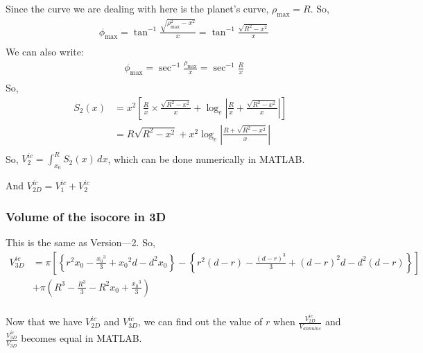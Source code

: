 \documentclass[12pt]{extarticle}
\begin{document}
Since the curve we are dealing with here is the planet's curve, $\rho_{\max} = R$. So,
\begin{align*} 
        &\phi_{\max} = \tan^{-1} \frac{\sqrt{\rho_{\max}^2 - x^2}}{x} = \tan^{-1} \frac{\sqrt{R^2 - x^2}}{x} \\
    \end{align*}
We can also write:
    \begin{align*} 
        &\phi_{\max} =  \sec^{-1} \frac{\rho_{\max}}{x} =  \sec^{-1} \frac{R}{x} \\
    \end{align*}
So,
    \begin{align*} 
        S_2 (x) &= x^2 \left[  \frac{R}{x} \times \frac{\sqrt{R^2 -x^2}}{x} + \log_e \left| \frac{R}{x} + \frac{\sqrt{R^2 -x^2}}{x}  \right|  \right] \\
        &= R \sqrt{R^2 -x^2} + x^2 \log_e \left| \frac{R+\sqrt{R^2 -x^2}}{x}  \right|   \\
    \end{align*}
So, $V^{ic}_2 = \int_{x_0}^{R} S_2(x) \,dx$, which can be done numerically in MATLAB.

And $V^{ic}_{2D} =  V^{ic}_1 + V^{ic}_2$

\subsubsection{Volume of the isocore in 3D}

This is the same as Version---2. So,
\begin{align*} 
    V^{ic}_{3D}&= \pi \left[ \left\{ r^2 x_0 - \frac{{x_0}^3}{3} + {x_0}^2d -d^2x_0 \right\} -   \left\{ r^2 (d-r) - \frac{(d-r)^3}{3} + (d-r)^2 d - d^2 (d-r) \right\}   \right] \\
       &+ \pi (R^3 - \frac{R^3}{3} - R^2 x_0 + \frac{{x_0}^3}{3}) \\
\end{align*}


Now that we have $V^{ic}_{2D}$ and $V^{ic}_{3D}$, we can find out the value of $r$ when $\frac{V^{ic}_{2D}}{V_{annulus}}$ and $\frac{V^{ic}_{3D}}{V_{3D}}$ becomes equal in MATLAB.
\end{document}
